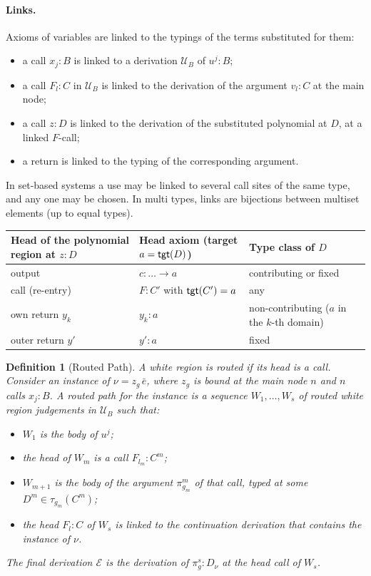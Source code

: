 \documentclass[10pt,a4paper]{article}
\theoremstyle{plain}%
\newtheorem{definition}[theorem]{Definition}
\begin{document}
\paragraph{Links.}
Axioms of variables are linked to the typings of the terms substituted for them:
\begin{itemize}
\item a call $x_j : B$ is linked to a derivation $\mathcal{U}_B$ of $u^j : B$;
\item a call $F_l : C$ in $\mathcal{U}_B$ is linked to the derivation of the argument $v_l : C$ at the main node;
\item a call $z : D$ is linked to the derivation of the substituted polynomial at $D$, at a linked $F$-call;
\item a return is linked to the typing of the corresponding argument.
\end{itemize}
In set-based systems a use may be linked to several call sites of the same type, and any one may be chosen.
In multi types, links are bijections between multiset elements (up to equal types).

\begin{table}[h]
\centering
\begin{tabular}{lll}
Head of the polynomial region at $z : D$ & Head axiom (target $a = \mathsf{tgt}(D)$) & Type class of $D$\\ \hline
output & $c : \ldots \to a$ & contributing or fixed\\
call (re-entry) & $F : C'$ with $\mathsf{tgt}(C') = a$ & any\\
own return $y_k$ & $y_k : a$ & non-contributing ($a$ in the $k$-th domain)\\
outer return $y'$ & $y' : a$ & fixed
\end{tabular}
\end{table}

\begin{definition}[Routed Path]
A white region is \emph{routed} if its head is a call.
Consider an instance of $\nu = z_g\,\bar e$, where $z_g$ is bound at the main node $n$ and $n$ calls $x_j : B$.
A \emph{routed path} for the instance is a sequence $W_1, \ldots, W_s$ of routed white region judgements in $\mathcal{U}_B$ such that:
\begin{itemize}
\item $W_1$ is the body of $u^j$;
\item the head of $W_m$ is a call $F_{l_m} : C^m$;
\item $W_{m+1}$ is the body of the argument $\pi^m_{g_m}$ of that call, typed at some $D^m \in \tau_{g_m}(C^m)$;
\item the head $F_l : C$ of $W_s$ is linked to the continuation derivation that contains the instance of $\nu$.
\end{itemize}
The \emph{final derivation} $\mathcal{E}$ is the derivation of $\pi^s_g : D_\nu$ at the head call of $W_s$.
\end{definition}
\end{document}
